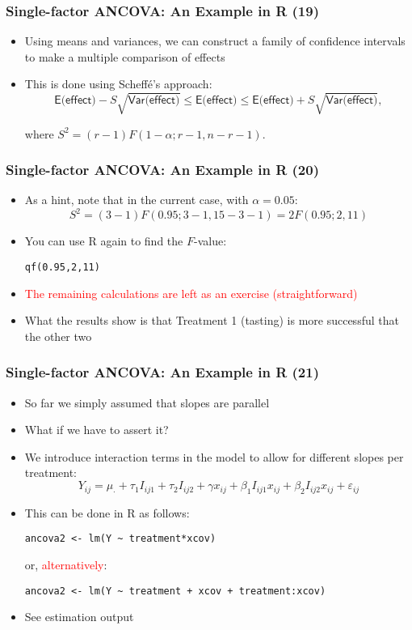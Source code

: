 \documentclass[10pt]{beamer}
\theoremstyle{definition}
\begin{document}
\begin{frame}[fragile]
\frametitle{Single-factor ANCOVA: An Example in R (19)}
\begin{itemize}
	\item Using means and variances, we can construct a family of confidence intervals to make a multiple comparison of effects
	\item This is done using Scheff\'{e}'s approach:
	\[
		\textsf{E(effect)} - S\sqrt{\textsf{Var(effect)}} \leq \textsf{E(effect)} \leq \textsf{E(effect)} + S\sqrt{\textsf{Var(effect)}},
	\]
	
	where $S^{2} = (r-1)F(1-\alpha;r-1,n-r-1)$.
	
\end{itemize}
\end{frame}

\begin{frame}[fragile]
\frametitle{Single-factor ANCOVA: An Example in R (20)}
\begin{itemize}
	\item As a hint, note that in the current case, with $\alpha = 0.05$:
	\[
		S^{2} = (3-1)F(0.95;3-1,15-3-1) = 2F(0.95;2,11)
	\]
	\item You can use R again to find the $F$-value:
	\begin{lstlisting}[style = rstyle, breaklines] 
		qf(0.95,2,11)
	\end{lstlisting}
	\item \textcolor{red}{The remaining calculations are left as an exercise (straightforward)}
	\item What the results show is that Treatment 1 (tasting) is more successful that the other two
\end{itemize}
\end{frame}

\begin{frame}[fragile]
\frametitle{Single-factor ANCOVA: An Example in R (21)}
\begin{itemize}
	\item So far we simply assumed that slopes are parallel
	\item What if we have to assert it?
	\item We introduce interaction terms in the model to allow for different slopes per treatment:
	\[
		Y_{ij} = \mu_{\cdot} + \tau_{1}I_{ij1} + \tau_{2}I_{ij2} + \gamma x_{ij} + \beta_{1}I_{ij1}x_{ij} + \beta_{2}I_{ij2}x_{ij} + \varepsilon_{ij}
	\]
	\item This can be done in R as follows:
	\begin{lstlisting}[style = rstyle, breaklines] 
	ancova2 <- lm(Y ~ treatment*xcov)
	\end{lstlisting}
	or, \textcolor{red}{alternatively}:
	\begin{lstlisting}[style = rstyle, breaklines] 
	ancova2 <- lm(Y ~ treatment + xcov + treatment:xcov)
	\end{lstlisting}

	\item See estimation output
\end{itemize}
\end{frame}
\end{document}

